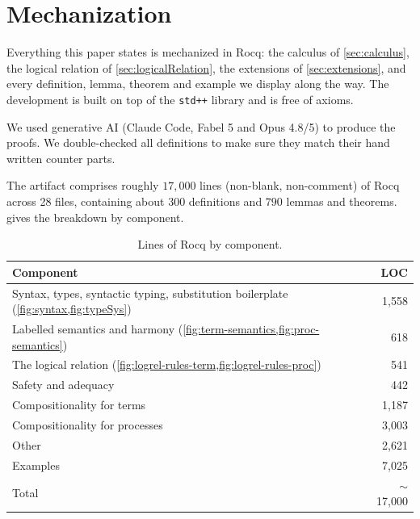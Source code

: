 
\section{Mechanization}
\label{sec:mechanization}

Everything this paper states is mechanized in Rocq: the calculus of
\cref{sec:calculus}, the logical relation of
\cref{sec:logicalRelation}, the extensions of \cref{sec:extensions},
and every definition, lemma, theorem and example we display along the
way.
The development is built on top of the \texttt{std++} library and is
free of axioms.

We used generative AI (Claude Code, Fabel 5 and Opus 4.8/5) to produce the proofs. We double-checked all definitions to make sure they match their hand written counter parts.

The artifact comprises roughly $17{,}000$ lines (non-blank, non-comment)
of Rocq across 28 files, containing about $300$ definitions and $790$
lemmas and theorems.
 gives the breakdown by component.
\begin{table}[t]
  \caption{Lines of Rocq by component.}
  \label{tab:mechanization}
  \begin{tabular}{lr}
    \toprule
    Component & LOC \\
    \midrule
    Syntax, types, syntactic typing, substitution boilerplate (\cref{fig:syntax,fig:typeSys})   & 1,558 \\
    Labelled semantics and harmony (\cref{fig:term-semantics,fig:proc-semantics}) & 618 \\
    The logical relation (\cref{fig:logrel-rules-term,fig:logrel-rules-proc})     & 541 \\
    Safety and adequacy                                               & 442 \\
    Compositionality for terms                                        & 1,187 \\
    Compositionality for processes                                    & 3,003 \\
    Other                           & 2,621 \\
    Examples                                                          & 7,025 \\
    \midrule
    Total                                                             & $\sim$17,000 \\
    \bottomrule
  \end{tabular}
\end{table}

